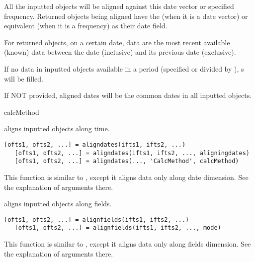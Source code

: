 \begin{argdesc}
                     \begin{itemize*}
                     \item All the inputted \myfints{} objects will be aligned
                      against this date vector or specified frequency. 
                      Returned objects being aligned
                      have the  (when it is a date vector)
                      or equivalent (when it is a frequency) as their date field. 

                     \item For returned objects, on a certain date, 
                      data are the most recent available (known) data 
                      between the date (inclusive) and its previous date
                      (exclusive). 

                     If no data in inputted objects available 
                      in a period (specified or divided by ),
                      s will be filled.

                     \item If NOT provided, aligned dates will be the common dates
                      in all inputted objects.
                     \end{itemize*}
	   \item[calcMethod]
	                 
   \end{argdesc}
%


   aligns inputted  objects along time.

\usage
%
   \begin{lstlisting}[numbers=none]
   [ofts1, ofts2, ...] = aligndates(ifts1, ifts2, ...)
   [ofts1, ofts2, ...] = aligndates(ifts1, ifts2, ..., aligningdates)
   [ofts1, ofts2, ...] = aligndates(..., 'CalcMethod', calcMethod)
   \end{lstlisting}
%
   This function is similar to , except it aligns data only along date dimension.
   See the explanation of arguments there. 
\medskip


   aligns inputted  objects along fields.
%
\usage
   \begin{lstlisting}[numbers=none]
   [ofts1, ofts2, ...] = alignfields(ifts1, ifts2, ...)
   [ofts1, ofts2, ...] = alignfields(ifts1, ifts2, ..., mode)
   \end{lstlisting}
%
   This function is similar to , except it aligns data only along fields dimension.
   See the explanation of arguments there. 
\medskip

